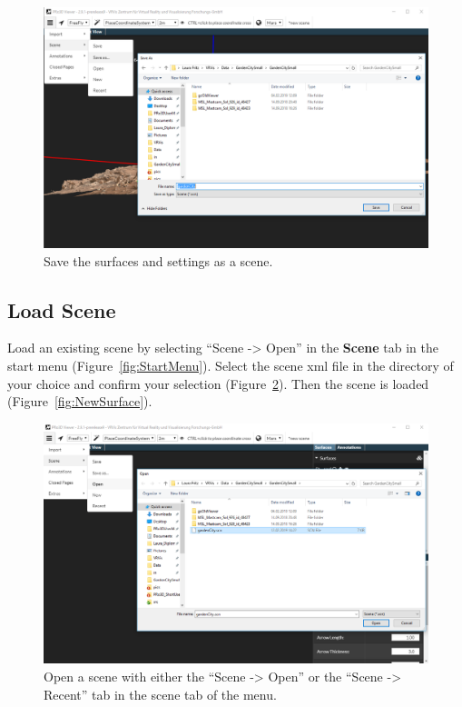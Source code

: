	\begin{figure}[h]
    	\centering
    		\includegraphics[width=1\textwidth]{pics/saveScene.png}
    	\caption[Save Scene]{Save the surfaces and settings as a scene. }
    	\label{fig:saveScene}
   \end{figure}
		
\subsection{Load Scene}
\label{sec:loadScene}

Load an existing scene by selecting ``Scene -> Open'' in the \textbf{Scene} tab in the start menu (Figure~\ref{fig:StartMenu}).
Select the scene xml file in the directory of your choice and confirm your selection (Figure~\ref{fig:OpenScene}).
Then the scene is loaded (Figure~\ref{fig:NewSurface}). 

\begin{figure}[h]
    	\centering
    		\includegraphics[width=1\textwidth]{pics/OpenScene.png}
    	\caption[Open Scene]{ Open a scene with either the ``Scene -> Open'' or the ``Scene -> Recent'' tab in the scene tab of the menu.}
    	\label{fig:OpenScene}
   \end{figure}
	
